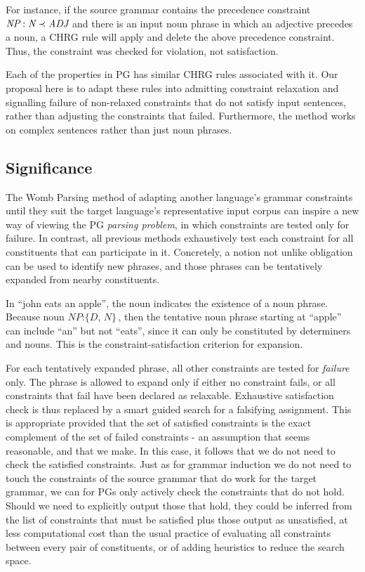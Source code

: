\documentclass{llncs}
\newcommand{\constituency}[2]{\textit{#1} : \textit{#2}}
\newcommand{\precedence}[3]{\textit{#1} : \textit{#2} \prec \textit{#3}}
\newcommand{\NP}{\textit{NP}\xspace}
\newcommand{\N}{\textit{N}\xspace}
\newcommand{\ADJ}{\textit{ADJ}\xspace}
\begin{document}
For instance, if the source grammar contains the precedence constraint $\precedence{\NP}{\N}{\ADJ}$
and there is an input noun phrase in which an adjective precedes a noun, a CHRG rule will apply and delete the above precedence constraint. Thus, the constraint was checked for violation, not satisfaction.

Each of the properties in PG has similar CHRG rules associated with it. Our proposal here is to adapt these rules into admitting constraint relaxation and signalling failure of non-relaxed constraints that do not satisfy input sentences, rather than adjusting the constraints that failed. Furthermore, the method works on complex sentences rather than just noun phrases.

\subsection{Significance}

The Womb Parsing method of adapting another language's grammar constraints  until they suit the target language's representative input corpus can inspire a new way of viewing the PG \emph{parsing problem}, in which  constraints are tested only for failure. In contrast, all previous methods exhaustively test each constraint for all constituents that can participate in it. Concretely, a notion  not unlike obligation can be used to identify new phrases, and those phrases can be tentatively expanded from nearby constituents.

\begin{example}In ``john eats an apple'', the noun indicates the existence of a noun phrase. Because noun $\constituency{NP}{\{D, N\}}$, then the tentative noun phrase starting at ``apple'' can include ``an'' but not ``eats'', since it can only be constituted by determiners and nouns. This is the constraint-satisfaction criterion for expansion.
\end{example}

For each tentatively expanded phrase, all other constraints are tested for \emph{failure} only. The phrase is allowed to expand only if either no constraint fails, or all constraints that fail have been declared as relaxable. Exhaustive satisfaction check is thus replaced by a smart guided search for a falsifying assignment. This is appropriate provided that  the set of satisfied constraints is the exact complement of the set of failed constraints - an assumption that seems reasonable, and that we make. In this case, it follows that we do not need to check the satisfied constraints.  Just as for grammar induction we do not need to touch the constraints of the source grammar that do work for the target grammar,  we can for PGs  only actively check  the constraints that do not hold. Should we need to explicitly output those that hold, they could be inferred  from the list of constraints that must be satisfied plus those output as unsatisfied, at less computational cost than the usual practice of evaluating  all constraints between every pair of constituents, or of adding heuristics to reduce the search space.
\end{document}

